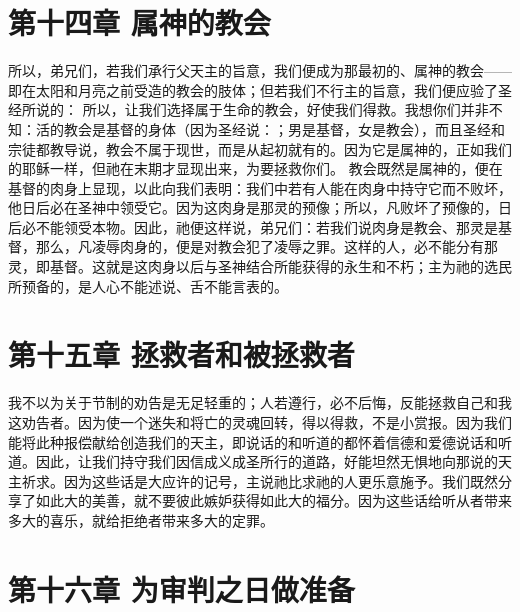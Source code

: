 
\section{第十四章  属神的教会}

所以，弟兄们，若我们承行父天主的旨意，我们便成为那最初的、属神的教会——即在太阳和月亮之前受造的教会的肢体；但若我们不行主的旨意，我们便应验了圣经所说的： 所以，让我们选择属于生命的教会，好使我们得救。我想你们并非不知：活的教会是基督的身体（因为圣经说：；男是基督，女是教会），而且圣经和宗徒都教导说，教会不属于现世，而是从起初就有的。因为它是属神的，正如我们的耶稣一样，但祂在末期才显现出来，为要拯救你们。 教会既然是属神的，便在基督的肉身上显现，以此向我们表明：我们中若有人能在肉身中持守它而不败坏，他日后必在圣神中领受它。因为这肉身是那灵的预像；所以，凡败坏了预像的，日后必不能领受本物。因此，祂便这样说，弟兄们：若我们说肉身是教会、那灵是基督，那么，凡凌辱肉身的，便是对教会犯了凌辱之罪。这样的人，必不能分有那灵，即基督。这就是这肉身以后与圣神结合所能获得的永生和不朽；主为祂的选民所预备的，是人心不能述说、舌不能言表的。\par


\section{第十五章  拯救者和被拯救者}

我不以为关于节制的劝告是无足轻重的；人若遵行，必不后悔，反能拯救自己和我这劝告者。因为使一个迷失和将亡的灵魂回转，得以得救，不是小赏报。因为我们能将此种报偿献给创造我们的天主，即说话的和听道的都怀着信德和爱德说话和听道。因此，让我们持守我们因信成义成圣所行的道路，好能坦然无惧地向那说的天主祈求。因为这些话是大应许的记号，主说祂比求祂的人更乐意施予。我们既然分享了如此大的美善，就不要彼此嫉妒获得如此大的福分。因为这些话给听从者带来多大的喜乐，就给拒绝者带来多大的定罪。\par


\section{第十六章 为审判之日做准备}

